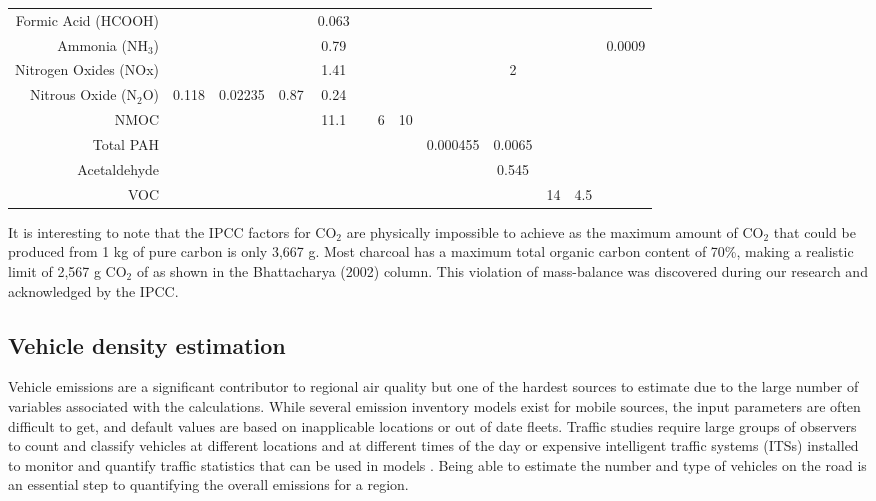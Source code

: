 \begin{sidewaystable}
\begin{table}[H]
{\begin{tabular}{@{}rcccccccccccc@{}}
Formic Acid (HCOOH) &  &  &  & 0.063 &  &  &  &  &  &  &  &  \\
Ammonia (NH$_{3}$) &  &  &  & 0.79 &  &  &  &  &  &  &  & 0.0009 \\
Nitrogen Oxides (NOx) &  &  &  & 1.41 &  &  &  &  & 2 &  &  &  \\
Nitrous Oxide (N$_{2}$O) & 0.118 & 0.02235 & 0.87 & 0.24 &  &  &  &  &  &  &  &  \\
NMOC &  &  &  & 11.1 &  & 6 & 10 &  &  &  &  &  \\
Total PAH &  &  &  &  &  &  &  & 0.000455 & 0.0065 &  &  &  \\
Acetaldehyde &  &  &  &  &  &  &  &  & 0.545 &  &  &  \\
VOC &  &  &  &  &  &  &  &  &  & 14 & 4.5 &  \\ \bottomrule
\end{tabular}
} %
\end{table}     
\end{sidewaystable}

It is interesting to note that the IPCC factors for CO$_{2}$ are physically impossible to achieve as the maximum amount of CO$_{2}$ that could be produced from 1 kg of pure carbon is only 3,667 g. Most charcoal has a maximum total organic carbon content of 70\%, making a realistic limit of 2,567 g CO$_{2}$ of as shown in the Bhattacharya (2002) column.  This violation of mass-balance was discovered during our research and acknowledged by the IPCC.
\clearpage
\subsection{Vehicle density estimation}

Vehicle emissions are a significant contributor to regional air quality but one of the hardest sources to estimate due to the large number of variables associated with the calculations. While several emission inventory models exist for mobile sources, the input parameters are often difficult to get, and default values are based on inapplicable locations or out of date fleets. Traffic studies require large groups of observers to count and classify vehicles at different locations and at different times of the day or expensive intelligent traffic systems (ITSs) installed to monitor and quantify traffic statistics that can be used in models \citep{Suzuki2015}. Being able to estimate the number and type of vehicles on the road is an essential step to quantifying the overall emissions for a region. 

